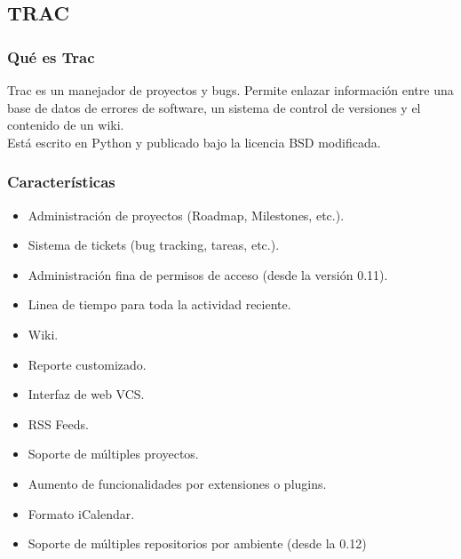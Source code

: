 \subsection{TRAC}

\subsubsection{Qué es Trac}
Trac es un manejador de proyectos y bugs.
Permite enlazar información entre una base de datos de errores de software, un sistema de control de versiones y el contenido de un wiki.\\
Está escrito en Python y publicado bajo la licencia BSD modificada.

\subsubsection{Características}
\begin{itemize}
    \item Administración de proyectos (Roadmap, Milestones, etc.).
    \item Sistema de tickets (bug tracking, tareas, etc.).
    \item Administración fina de permisos de acceso (desde la versión 0.11).
    \item Linea de tiempo para toda la actividad reciente.
    \item Wiki.
    \item Reporte customizado.
    \item Interfaz de web VCS.
    \item RSS Feeds.
    \item Soporte de múltiples proyectos.
    \item Aumento de funcionalidades por extensiones o plugins.
    \item Formato iCalendar.
    \item Soporte de múltiples repositorios por ambiente (desde la 0.12)
\end{itemize}


